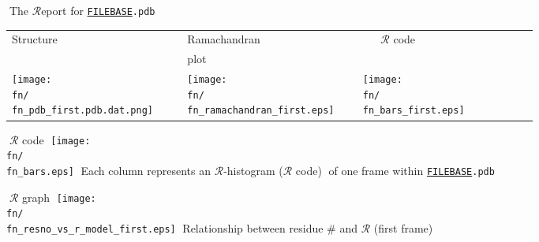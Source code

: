 \documentclass[10pt]{article}         %
\date{\vspace{-5ex}}
\newcommand{\fn}{FILEBASE}
\newcommand{\centerit}[1]{\noindent\textcolor{white}{.}\hfil#1\hfil\newline}
\begin{document}


\centerit{{\huge The ${\mathcal{R}}$eport for \texttt{\url{\fn}.pdb}}}

\vfill

\begin{tabular}{m{0.3\linewidth} m{0.3\linewidth} m{0.3\linewidth}}
\hfil \LARGE Structure \hfil & \hfil \LARGE Ramachandran \hfil & \hfil \LARGE\textcolor{white}{.}~~ ${\mathcal{R}}$ code \hfil \\
\hfil                        & \hfil \LARGE plot \hfil         &                                         \\
\hfil\texttt{[image: \\fn/\\fn\_pdb\_first.pdb.dat.png]}\hfil&
\hfil\texttt{[image: \\fn/\\fn\_ramachandran\_first.eps]}\hfil&
\hfil\texttt{[image: \\fn/\\fn\_bars\_first.eps]}\hfil\\
\end{tabular}

\vfill

\centerit{{\LARGE${\mathcal{R}}$ code}}
\newline
\centerit{\texttt{[image: \\fn/\\fn\_bars.eps]}}
\centerit{Each column represents an ${\mathcal{R}}$-histogram (${\mathcal{R}}$ code)}
\centerit{of one frame within \texttt{\url{\fn}.pdb}}

\vfill
\centerit{{\LARGE${\mathcal{R}}$ graph}}
\newline
\centerit{\texttt{[image: \\fn/\\fn\_resno\_vs\_r\_model\_first.eps]}}
\centerit{Relationship between residue \# and $\mathcal{R}$ (first frame)}

\vfill
\end{document}

